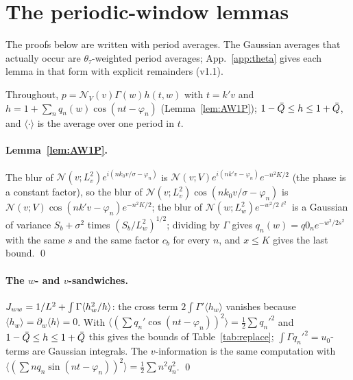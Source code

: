 \section{The periodic-window lemmas}
\label{app:plemmas}

The proofs below are written with period averages. The Gaussian averages that actually occur are $\theta_\tau$-weighted period averages;
App.~\ref{app:theta} gives each lemma in that form with explicit remainders (v1.1).

Throughout, $p=\mathcal N_V(v)\Gamma(w)h(t,w)$ with $t=k'v$ and $h=1+\sum_nq_n(w)\cos(nt-\varphi_n)$ (Lemma~\ref{lem:AW1P}); $1-\bar Q\le h\le1+\bar Q$, and
$\langle\cdot\rangle$ is the average over one period in $t$.

\paragraph*{Lemma~\ref{lem:AW1P}.}
The blur of $\mathcal N(v;L_v^2)e^{i(nk_0v/\sigma-\varphi_n)}$ is $\mathcal N(v;V)e^{i(nk'v-\varphi_n)}e^{-n^2K/2}$ (the phase is a constant factor), so the blur of $\mathcal N(v;L_v^2)\cos(nk_0v/\sigma-\varphi_n)$ is $\mathcal N(v;V)\cos(nk'v-\varphi_n)e^{-n^2K/2}$; the blur of $\mathcal N(w;L_w^2)e^{-w^2/2\ell^2}$ is a
Gaussian of variance $S_b+\sigma^2$ times $(S_b/L_w^2)^{1/2}$; dividing by $\Gamma$ gives $q_n(w)=q0_ne^{-w^2/2s^2}$ with the same $s$ and the same factor $c_b$ for every $n$, and $x\le K$ gives the last bound. \qed

\paragraph*{The $w$- and $v$-sandwiches.}
$J_{ww}=1/L^2+\int\Gamma\langle h_w^2/h\rangle$: the cross term $2\int\Gamma'\langle h_w\rangle$ vanishes because $\langle h_w\rangle=\partial_w\langle h\rangle=0$.
With $\langle(\sum q_n'\cos(nt-\varphi_n))^2\rangle=\tfrac12\sum q_n'^2$ and $1-\bar Q\le h\le1+\bar Q$ this gives the bounds of Table~\ref{tab:replace};
$\int\Gamma q_n'^2=u_0$-terms are Gaussian integrals. The $v$-information is the same computation with $\langle(\sum nq_n\sin(nt-\varphi_n))^2\rangle=\frac12\sum n^2q_n^2$. \qed

